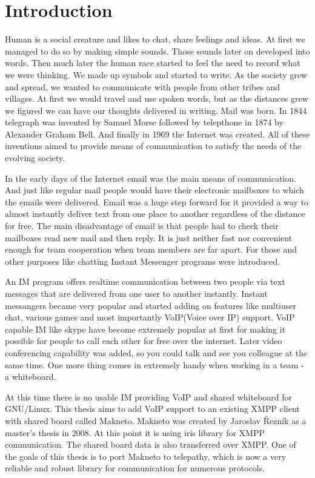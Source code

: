 
\chapter{Introduction}
Human is a social creature and likes to chat, share feelings and ideas. At first we managed to do so by making simple sounds. Those sounds later on developed into words. Then much later the human race started to feel the need to record what we were thinking. We made up symbols and started to write. As the society grew and spread, we wanted to communicate with people from other tribes and villages. At first we would travel and use spoken words, but as the distances grew we figured we can have our thoughts delivered in writing. Mail was born. In 1844 telegraph was invented by Samuel Morse followed by telepthone in 1874 by Alexander Graham Bell. And finally in 1969 the Internet was created. All of these inventions aimed to provide means of communication to satisfy the needs of the evolving society.  

In the early days of the Internet email was the main means of communication. And just like regular mail people would have their electronic mailboxes to which the emails were delivered. Email was a huge step forward for it provided a way to almost instantly deliver text from one place to another regardless of the distance for free. The main disadvantage of email is that people had to check their mailboxes read new mail and then reply. It is just neither fast nor convenient enough for team cooperation when team members are far apart. For those and other purposes like chatting Instant Messenger programs were introduced.    

An IM program offers realtime communication between two people via text messages that are delivered from one user to another instantly. Instant messangers became very popular and started adding on features like multiuser chat, various games and most importantly VoIP(Voice over IP) support. VoIP capable IM like skype have become extremely popular at first for making it possible for people to call each other for free over the internet. Later video conferencing capability was added, so you could talk and see you colleague at the same time. One more thing comes in extremely handy when working in a team - a whiteboard.

At this time there is no usable IM providing VoIP and shared whiteboard for GNU/Linux. This thesis aims to add VoIP support to an existing XMPP client with shared board called Makneto. Makneto was created by Jaroslav Řezník as a master's thesis in 2008. At this point it is using iris library for XMPP communication. The shared board data is also transferred over XMPP. One of the goals of this thesis is to port Makneto to telepathy, which is now a very reliable and robust library for communication for numerous protocols.  

